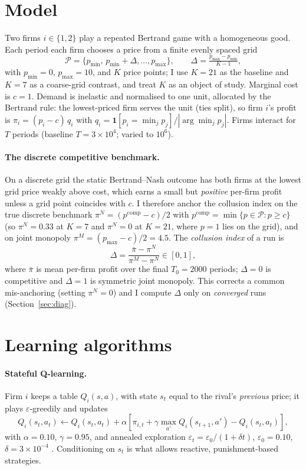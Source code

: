 \documentclass[11pt]{article}
\begin{document}
\section{Model}\label{sec:model}
Two firms $i\in\{1,2\}$ play a repeated Bertrand game with a homogeneous good. Each period each firm chooses
a price from a finite evenly spaced grid
\[
\mathcal P=\{p_{\min},\,p_{\min}+\Delta,\dots,p_{\max}\},\qquad \Delta=\tfrac{p_{\max}-p_{\min}}{K-1},
\]
with $p_{\min}=0$, $p_{\max}=10$, and $K$ price points; I use $K=21$ as the baseline and $K=7$ as a
coarse-grid contrast, and treat $K$ as an object of study. Marginal cost is $c=1$. Demand is inelastic and
normalised to one unit, allocated by the Bertrand rule: the lowest-priced firm serves the unit (ties split),
so firm $i$'s profit is $\pi_i=(p_i-c)\,q_i$ with $q_i=\mathbf 1[p_i=\min_j p_j]/|\arg\min_j p_j|$. Firms
interact for $T$ periods (baseline $T=3\times10^4$; varied to $10^6$).

\paragraph{The discrete competitive benchmark.} On a discrete grid the static Bertrand--Nash outcome
\citep{tirole1988theory} has both firms at the lowest grid price weakly above cost, which earns a small but \emph{positive} per-firm
profit unless a grid point coincides with $c$. I therefore anchor the collusion index on the true discrete
benchmark $\pi^N=(p^{\mathrm{comp}}-c)/2$ with $p^{\mathrm{comp}}=\min\{p\in\mathcal P:p\ge c\}$
(so $\pi^N=0.33$ at $K=7$ and $\pi^N=0$ at $K=21$, where $p=1$ lies on the grid), and on joint monopoly
$\pi^M=(p_{\max}-c)/2=4.5$. The \emph{collusion index} of a run is
\begin{equation}
\Delta=\frac{\bar\pi-\pi^N}{\pi^M-\pi^N}\in[0,1],
\label{eq:delta}
\end{equation}
where $\bar\pi$ is mean per-firm profit over the final $T_0=2000$ periods; $\Delta=0$ is competitive and
$\Delta=1$ is symmetric joint monopoly. This corrects a common mis-anchoring (setting $\pi^N=0$) and I
compute $\Delta$ only on \emph{converged} runs (Section~\ref{sec:diag}).

\section{Learning algorithms}\label{sec:algos}
\paragraph{Stateful Q-learning.} Firm $i$ keeps a table $Q_i(s,a)$, with state $s_t$ equal to the rival's
\emph{previous} price; it plays $\varepsilon$-greedily and updates
\begin{equation}
Q_i(s_t,a_t)\leftarrow Q_i(s_t,a_t)+\alpha\!\left[\pi_{i,t}+\gamma\max_{a'}Q_i(s_{t+1},a')-Q_i(s_t,a_t)\right],
\label{eq:q}
\end{equation}
with $\alpha=0.10$, $\gamma=0.95$, and annealed exploration $\varepsilon_t=\varepsilon_0/(1+\delta t)$,
$\varepsilon_0=0.10$, $\delta=3\times10^{-4}$ \citep{watkins1992qlearning}. Conditioning on $s_t$ is what
allows reactive, punishment-based strategies.
\end{document}
